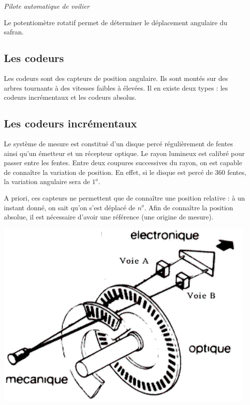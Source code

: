 \documentclass[10pt]{article}
\begin{document}
\begin{exemple}
\textit{Pilote automatique de voilier}

Le potentiomètre rotatif permet de déterminer le déplacement angulaire du safran.
\end{exemple}

\subsection{Les codeurs}
Les codeurs sont des capteurs de position angulaire. Ils sont montés sur des arbres tournants à des vitesses faibles à élevées. Il en existe deux types : les codeurs incrémentaux et les codeurs absolus.

\subsection{Les codeurs incrémentaux}

\begin{minipage}[c]{.6\linewidth}
Le système de mesure est constitué d'un disque percé régulièrement de fentes ainsi qu'un émetteur et un récepteur optique. Le rayon lumineux est calibré pour passer entre les fentes. Entre deux coupures successives du rayon, on est capable de connaître la variation de position. 
En effet, si le disque est percé de 360 fentes, la variation angulaire sera de $1^o$.

A priori, ces capteurs ne permettent que de connaître une position relative : à un instant donné, on sait qu'on s'est déplacé de $n^o$. Afin de connaître la position absolue, il est nécessaire d'avoir une référence (une origine de mesure). 
\end{minipage}\hfill
\begin{minipage}[c]{.35\linewidth}
\begin{center}
    \includegraphics[width=.9\textwidth]{images/codeur_inc.png}
\end{center}
\end{minipage}
\end{document}
